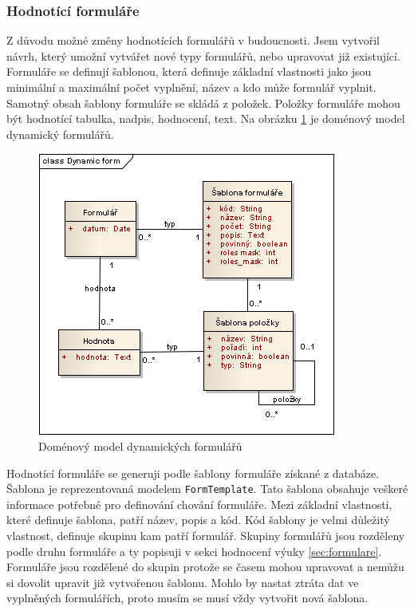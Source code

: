 \subsubsection{Hodnotící formuláře}
Z důvodu možné změny hodnotících formulářů v budoucnosti. Jsem vytvořil návrh, který umožní vytvářet nové typy formulářů, nebo upravovat již existující. Formuláře se definují šablonou, která definuje základní vlastnosti jako jsou minimální a maximální počet vyplnění, název a kdo může formulář vyplnit. Samotný obsah šablony formuláře se skládá z položek. Položky formuláře mohou být hodnotící tabulka, nadpis, hodnocení, text. Na obrázku \ref{fig:dynamicform} je doménový model dynamický formulářů.

\begin{figure}[h]
\begin{center}
\includegraphics[scale=0.6]{figures/Dynamic_form}
\caption{Doménový model dynamických formulářů}
\label{fig:dynamicform}
\end{center}
\end{figure}

Hodnotící formuláře se generuji podle šablony formuláře získané z databáze. Šablona je reprezentovaná modelem \verb|FormTemplate|. Tato šablona obsahuje veškeré informace potřebné pro definování chování formuláře. Mezi základní vlastnosti, které definuje šablona, patří název, popis a kód. Kód šablony je velmi důležitý vlastnost, definuje skupinu kam patří formulář. Skupiny formulářů jsou rozděleny podle druhu formuláře a ty popisuji v sekci hodnocení výuky \ref{sec:formulare}. Formuláře jsou rozdělené do skupin protože se časem mohou upravovat a nemůžu si dovolit upravit již vytvořenou šablonu. Mohlo by nastat ztráta dat ve vyplněných formulářích, proto musím se musí vždy vytvořit nová šablona.  

